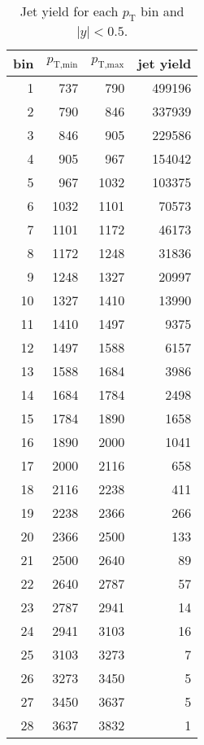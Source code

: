 
\begin{table}[htp]
  \caption{Jet yield for each $p_\textrm{T}$ bin and $|y| < 0.5$.}
  \label{tab:yield}
  \medskip
  \centering
  \begin{tabular}{|r|rr|r|}
  \hline
  bin	& $p_\textrm{T,min}$	& $p_\textrm{T,max}$	& jet yield \\ \hline
    1	&     737	&     790	&    499196	\\ \hline
   2	&     790	&     846	&    337939	\\ \hline
   3	&     846	&     905	&    229586	\\ \hline
   4	&     905	&     967	&    154042	\\ \hline
   5	&     967	&    1032	&    103375	\\ \hline
   6	&    1032	&    1101	&     70573	\\ \hline
   7	&    1101	&    1172	&     46173	\\ \hline
   8	&    1172	&    1248	&     31836	\\ \hline
   9	&    1248	&    1327	&     20997	\\ \hline
  10	&    1327	&    1410	&     13990	\\ \hline
  11	&    1410	&    1497	&      9375	\\ \hline
  12	&    1497	&    1588	&      6157	\\ \hline
  13	&    1588	&    1684	&      3986	\\ \hline
  14	&    1684	&    1784	&      2498	\\ \hline
  15	&    1784	&    1890	&      1658	\\ \hline
  16	&    1890	&    2000	&      1041	\\ \hline
  17	&    2000	&    2116	&       658	\\ \hline
  18	&    2116	&    2238	&       411	\\ \hline
  19	&    2238	&    2366	&       266	\\ \hline
  20	&    2366	&    2500	&       133	\\ \hline
  21	&    2500	&    2640	&        89	\\ \hline
  22	&    2640	&    2787	&        57	\\ \hline
  23	&    2787	&    2941	&        14	\\ \hline
  24	&    2941	&    3103	&        16	\\ \hline
  25	&    3103	&    3273	&         7	\\ \hline
  26	&    3273	&    3450	&         5	\\ \hline
  27	&    3450	&    3637	&         5	\\ \hline
  28	&    3637	&    3832	&         1	\\ \hline
\end{tabular}
\end{table}
